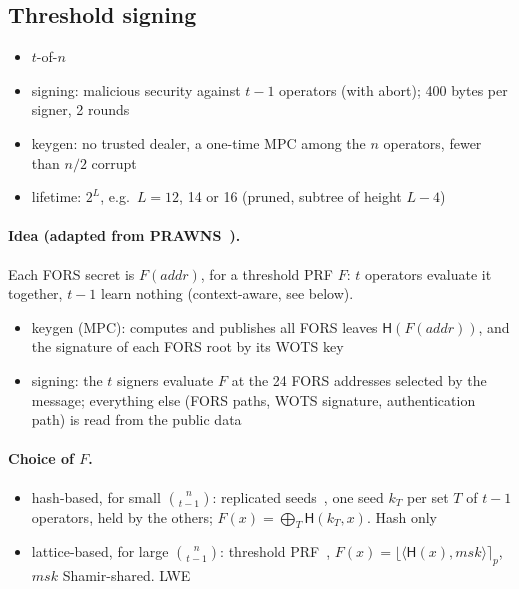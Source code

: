 \documentclass[11pt]{article}
\newcommand{\hash}{\mathsf{H}}
\begin{document}
\subsection{Threshold signing}

\begin{itemize}
  \item $t$-of-$n$
  \item signing: malicious security against $t-1$ operators (with abort); 400 bytes per signer, 2 rounds
  \item keygen: no trusted dealer, a one-time MPC among the $n$ operators, fewer than $n/2$ corrupt
  \item lifetime: $2^L$, e.g.\ $L=12$, 14 or 16 (pruned, subtree of height $L-4$)
\end{itemize}

\paragraph{Idea (adapted from PRAWNS~\cite{PRAWNS}).} Each FORS secret is $F(\mathit{addr})$, for a
threshold PRF $F$: $t$ operators evaluate it together, $t-1$ learn nothing (context-aware, see below).
\begin{itemize}
  \item keygen (MPC): computes and publishes all FORS leaves $\hash(F(\mathit{addr}))$, and the signature of
        each FORS root by its WOTS key
  \item signing: the $t$ signers evaluate $F$ at the 24 FORS addresses selected by the message; everything
        else (FORS paths, WOTS signature, authentication path) is read from the public data
\end{itemize}

\paragraph{Choice of $F$.}
\begin{itemize}
  \item hash-based, for small $\binom{n}{t-1}$: replicated seeds~\cite{CDI05}, one seed $k_T$ per set $T$ of $t-1$
        operators, held by the others; $F(x)=\bigoplus_T\hash(k_T,x)$. Hash only
  \item lattice-based, for large $\binom{n}{t-1}$: threshold PRF~\cite{PRAWNS},
        $F(x)=\lfloor\langle\hash(x),\mathit{msk}\rangle\rceil_p$, $\mathit{msk}$ Shamir-shared. LWE
\end{itemize}
\end{document}

